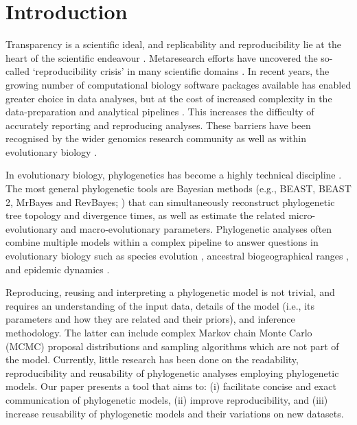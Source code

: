 \documentclass[10pt,letterpaper,table]{article}
\theoremstyle{definition}
\begin{document}
\linenumbers

\section{Introduction}
Transparency is a scientific ideal, and replicability and
reproducibility lie at the heart of the scientific endeavour
\cite{nas19,munafo17}. 
Metaresearch efforts have uncovered the so-called `reproducibility
crisis' \cite{baker16} in many scientific domains \cite{baker16}. 
In recent years, the growing number of computational biology software packages available has enabled greater choice in data analyses, 
but at the cost of increased complexity in the data-preparation and analytical pipelines \cite{eren2021community}. 
This increases the difficulty of accurately reporting and reproducing analyses. 
These barriers have been recognised by the wider genomics research community \cite{eren2021community} as well as within evolutionary biology \cite{oakley2014osiris}. 

In evolutionary biology, phylogenetics has become a highly technical discipline \cite{oakley2014osiris}. 
The most general phylogenetic tools are Bayesian methods (e.g., BEAST, BEAST 2, MrBayes and
RevBayes; \cite{beast,beast2,revbayes,mrbayes}) 
that can simultaneously reconstruct phylogenetic tree topology and divergence times, as well as estimate the related micro-evolutionary and macro-evolutionary parameters. 
Phylogenetic analyses often combine multiple models within a complex pipeline to answer questions in evolutionary biology such as species evolution \cite{gavryushkina17,ogilvie21}, 
ancestral biogeographical ranges \cite{lemey10,landis18}, and epidemic dynamics \cite{faria21,douglas21}. 

Reproducing, reusing and interpreting a phylogenetic model is not trivial, and requires an understanding of the input data, details of the model (i.e., its parameters and how they are related and their priors), and inference methodology. 
The latter can include complex Markov chain Monte Carlo (MCMC) proposal distributions and sampling algorithms which are not part of the model.
Currently, little research has been done on the readability, reproducibility and reusability of phylogenetic analyses employing phylogenetic models. 
Our paper presents a tool that aims to: (i) facilitate concise and exact communication of phylogenetic models, (ii) improve reproducibility, and (iii) increase reusability of phylogenetic models and their variations on new datasets. 
\end{document}
